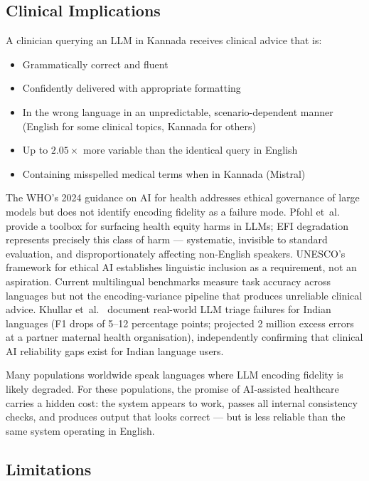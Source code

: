 \documentclass[11pt,a4paper]{article}
\begin{document}
\subsection{Clinical Implications}

A clinician querying an LLM in Kannada receives clinical advice that is:

\begin{itemize}
    \item Grammatically correct and fluent
    \item Confidently delivered with appropriate formatting
    \item In the wrong language in an unpredictable, scenario-dependent manner (English for some clinical topics, Kannada for others)
    \item Up to $2.05\times$ more variable than the identical query in English
    \item Containing misspelled medical terms when in Kannada (Mistral)
\end{itemize}

The WHO's 2024 guidance on AI for health \citep{who2024} addresses ethical governance of large models but does not identify encoding fidelity as a failure mode. Pfohl et~al.\ \citep{pfohl2024} provide a toolbox for surfacing health equity harms in LLMs; EFI degradation represents precisely this class of harm --- systematic, invisible to standard evaluation, and disproportionately affecting non-English speakers. UNESCO's framework for ethical AI \citep{unesco2023} establishes linguistic inclusion as a requirement, not an aspiration. Current multilingual benchmarks \citep{xuan2025,adelani2025} measure task accuracy across languages but not the encoding-variance pipeline that produces unreliable clinical advice. Khullar et~al.\ \citep{khullar2025} document real-world LLM triage failures for Indian languages (F1 drops of 5--12 percentage points; projected 2 million excess errors at a partner maternal health organisation), independently confirming that clinical AI reliability gaps exist for Indian language users.

Many populations worldwide speak languages where LLM encoding fidelity is likely degraded. For these populations, the promise of AI-assisted healthcare carries a hidden cost: the system appears to work, passes all internal consistency checks, and produces output that looks correct --- but is less reliable than the same system operating in English.

\subsection{Limitations}
\end{document}
